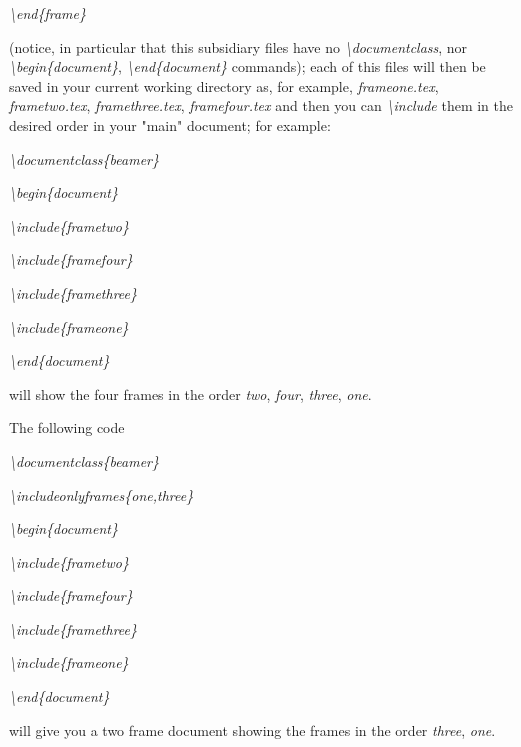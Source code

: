 \emph{\textbackslash{}end\{frame\}}

(notice, in particular that this subsidiary files have no
\emph{\textbackslash{}documentclass}, nor
\emph{\textbackslash{}begin\{document\}},
\emph{\textbackslash{}end\{document\}} commands); each of this files
will then be saved in your current working directory as, for example,
\emph{frameone.tex}, \emph{frametwo.tex}, \emph{framethree.tex},
\emph{framefour.tex} and then you can \emph{\textbackslash{}include}
them in the desired order in your "main" document; for example:

\emph{\textbackslash{}documentclass\{beamer\}}

\emph{\textbackslash{}begin\{document\}}

\emph{\textbackslash{}include\{frametwo\}}

\emph{\textbackslash{}include\{framefour\}}

\emph{\textbackslash{}include\{framethree\}}

\emph{\textbackslash{}include\{frameone\}}

\emph{\textbackslash{}end\{document\}}

will show the four frames in the order \emph{two}, \emph{four},
\emph{three}, \emph{one}.

The following code

\emph{\textbackslash{}documentclass\{beamer\}}

\emph{\textbackslash{}includeonlyframes\{one,three\}}

\emph{\textbackslash{}begin\{document\}}

\emph{\textbackslash{}include\{frametwo\}}

\emph{\textbackslash{}include\{framefour\}}

\emph{\textbackslash{}include\{framethree\}}

\emph{\textbackslash{}include\{frameone\}}

\emph{\textbackslash{}end\{document\}}

will give you a two frame document showing the frames in the order
\emph{three}, \emph{one}.
